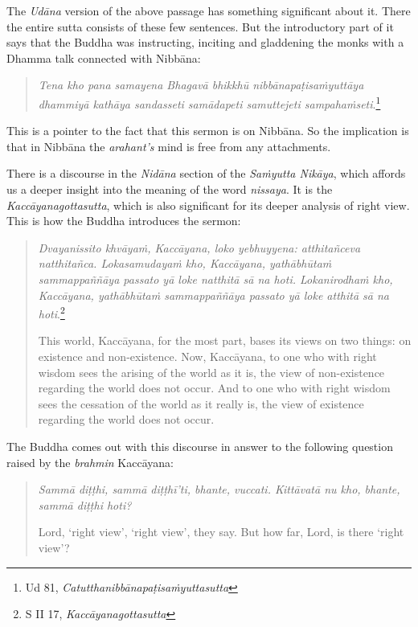 The \emph{Udāna} version of the above passage has something significant about it. There the entire sutta consists of these few sentences. But the introductory part of it says that the Buddha was instructing, inciting and gladdening the monks with a Dhamma talk connected with Nibbāna:

\begin{quote}
\emph{Tena kho pana samayena Bhagavā bhikkhū nibbānapaṭisaṁyuttāya dhammiyā kathāya sandasseti samādapeti samuttejeti sampahaṁseti}.\footnote{Ud 81, \emph{Catutthanibbānapaṭisaṁyuttasutta}}
\end{quote}

This is a pointer to the fact that this sermon is on Nibbāna. So the implication is that in Nibbāna the \emph{arahant's} mind is free from any attachments.

There is a discourse in the \emph{Nidāna} section of the \emph{Saṁyutta Nikāya}, which affords us a deeper insight into the meaning of the word \emph{nissaya}. It is the \emph{Kaccāyanagottasutta}, which is also significant for its deeper analysis of right view. This is how the Buddha introduces the sermon:

\begin{quote}
\emph{Dvayanissito khvāyaṁ, Kaccāyana, loko yebhuyyena: atthitañceva natthitañca. Lokasamudayaṁ kho, Kaccāyana, yathābhūtaṁ sammappaññāya passato yā loke natthitā sā na hoti. Lokanirodhaṁ kho, Kaccāyana, yathābhūtaṁ sammappaññāya passato yā loke atthitā sā na hoti}.\footnote{S II 17, \emph{Kaccāyanagottasutta}}

This world, Kaccāyana, for the most part, bases its views on two things: on existence and non-existence. Now, Kaccāyana, to one who with right wisdom sees the arising of the world as it is, the view of non-existence regarding the world does not occur. And to one who with right wisdom sees the cessation of the world as it really is, the view of existence regarding the world does not occur.
\end{quote}

The Buddha comes out with this discourse in answer to the following question raised by the \emph{brahmin} Kaccāyana:

\begin{quote}
\emph{Sammā diṭṭhi, sammā diṭṭhī'ti, bhante, vuccati. Kittāvatā nu kho, bhante, sammā diṭṭhi hoti?}

Lord, `right view', `right view', they say. But how far, Lord, is there `right view'?
\end{quote}

